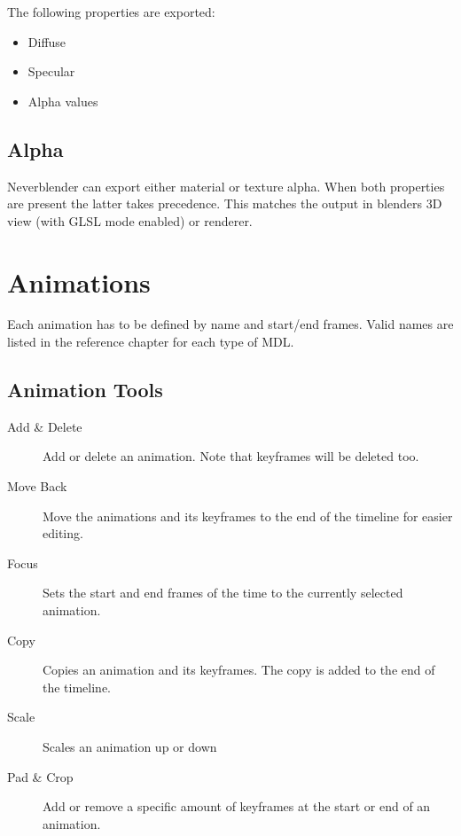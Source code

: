 The following properties are exported:
\begin{itemize}
    \item Diffuse
    \item Specular
    \item Alpha values
\end{itemize}

\subsection*{Alpha}
Neverblender can export either material or texture alpha. When both properties are present 
the latter takes precedence. This matches the output in blenders 3D view (with GLSL mode enabled) 
or renderer.

\section{Animations}
Each animation has to be defined by name and start/end frames. Valid names 
are listed in the reference chapter for each type of MDL.

\subsection{Animation Tools}

\begin{description}
\item[Add \& Delete] Add or delete an animation. Note that keyframes will be deleted too.
\item[Move Back] Move the animations and its keyframes to the end of the timeline for easier editing.
\item[Focus] Sets the start and end frames of the time to the currently selected animation.
\item[Copy] Copies an animation and its keyframes. The copy is added to the end of the timeline.
\item[Scale] Scales an animation up or down
\item[Pad \& Crop] Add or remove a specific amount of keyframes at the start or end of an animation.
\end{description}

